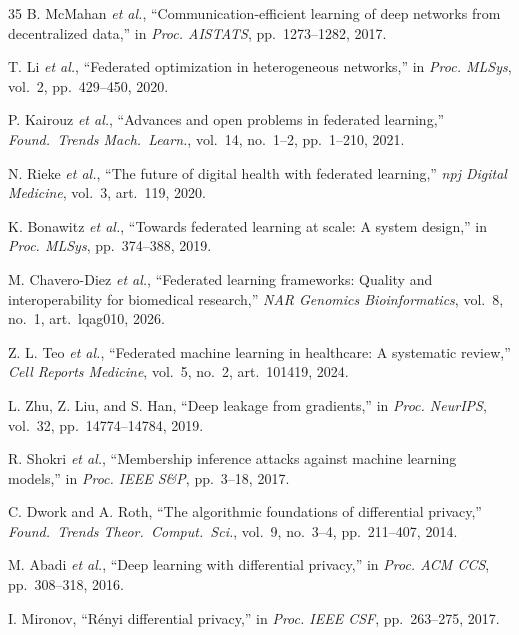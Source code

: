 \documentclass[conference,letterpaper]{IEEEtran}
\begin{document}
\begin{thebibliography}{35}
B. McMahan \textit{et al.}, ``Communication-efficient learning of deep networks from decentralized data,'' in \textit{Proc. AISTATS}, pp.~1273--1282, 2017.

T. Li \textit{et al.}, ``Federated optimization in heterogeneous networks,'' in \textit{Proc. MLSys}, vol.~2, pp.~429--450, 2020.

P. Kairouz \textit{et al.}, ``Advances and open problems in federated learning,'' \textit{Found.~Trends Mach.~Learn.}, vol.~14, no.~1--2, pp.~1--210, 2021.

N. Rieke \textit{et al.}, ``The future of digital health with federated learning,'' \textit{npj Digital Medicine}, vol.~3, art.~119, 2020.

K. Bonawitz \textit{et al.}, ``Towards federated learning at scale: A system design,'' in \textit{Proc. MLSys}, pp.~374--388, 2019.

M. Chavero-Diez \textit{et al.}, ``Federated learning frameworks: Quality and interoperability for biomedical research,'' \textit{NAR Genomics Bioinformatics}, vol.~8, no.~1, art.~lqag010, 2026.

Z. L. Teo \textit{et al.}, ``Federated machine learning in healthcare: A systematic review,'' \textit{Cell Reports Medicine}, vol.~5, no.~2, art.~101419, 2024.

L. Zhu, Z. Liu, and S. Han, ``Deep leakage from gradients,'' in \textit{Proc. NeurIPS}, vol.~32, pp.~14774--14784, 2019.

R. Shokri \textit{et al.}, ``Membership inference attacks against machine learning models,'' in \textit{Proc. IEEE S\&P}, pp.~3--18, 2017.

C. Dwork and A. Roth, ``The algorithmic foundations of differential privacy,'' \textit{Found.~Trends Theor.~Comput.~Sci.}, vol.~9, no.~3--4, pp.~211--407, 2014.

M. Abadi \textit{et al.}, ``Deep learning with differential privacy,'' in \textit{Proc. ACM CCS}, pp.~308--318, 2016.

I. Mironov, ``R\'enyi differential privacy,'' in \textit{Proc. IEEE CSF}, pp.~263--275, 2017.


\end{thebibliography}
\end{document}
